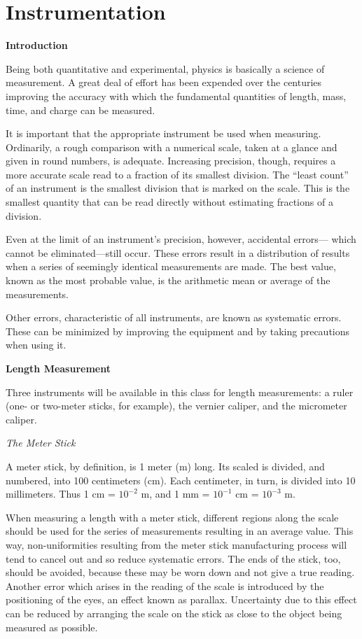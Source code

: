 
\section{Instrumentation}

\textbf{Introduction}

Being both quantitative and experimental, physics is basically a science of measurement. A great deal of effort has been expended over the centuries improving the accuracy with which the fundamental quantities of length, mass, time, and charge can be measured.

It is important that the appropriate instrument be used when measuring. Ordinarily, a rough comparison with a numerical scale, taken at a glance and given in round numbers, is adequate. Increasing precision, though, requires a more accurate scale read to a fraction of its smallest division. The ``least count'' of an instrument is the smallest division that is marked on the scale. This is the smallest quantity that can be read directly without estimating fractions of a division.

Even at the limit of an instrument's precision, however, accidental errors--- which cannot be eliminated---still occur. These errors result in a distribution of results when a series of seemingly identical measurements are made. The best value, known as the most probable value, is the arithmetic mean or average of the measurements.

Other errors, characteristic of all instruments, are known as systematic errors. These can be minimized by improving the equipment and by taking precautions when using it.

\textbf{Length Measurement}

Three instruments will be available in this class for length measurements: \hspace{3pt} a ruler (one- or two-meter sticks, for example), the vernier caliper, and the micrometer caliper.

\textit{The Meter Stick}

A meter stick, by definition, is 1 meter (m) long. Its scaled is divided, and numbered, into 100 centimeters (cm). Each centimeter, in turn, is divided into 10 millimeters. Thus 1 cm = $10^{-2}$ m, and 1 mm = $10^{-1}$ cm = $10^{-3}$ m.

When measuring a length with a meter stick, different regions along the scale should be used for the series of measurements resulting in an average value. This way, non-uniformities resulting from the meter stick manufacturing process will tend to cancel out and so reduce systematic errors. The ends of the stick, too, should be avoided, because these may be worn down and not give a true reading. Another error which arises in the reading of the scale is introduced by the positioning of the eyes, an effect known as parallax. Uncertainty due to this effect can be reduced by arranging the scale on the stick as close to the object being measured as possible.

